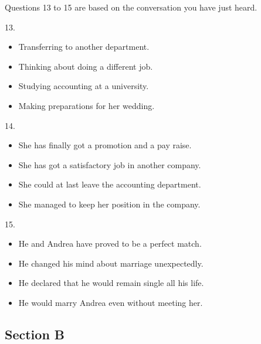 \documentclass[UTF8,11pt]{ctexart}
\begin{document}
Questions 13 to 15 are based on the conversation you have just heard.


13.


\begin{itemize}[leftmargin=2em,itemsep=.2em,topsep=.4em]\item[A.] Transferring to another department.
\item[C.] Thinking about doing a different job.
\end{itemize}

\begin{itemize}[leftmargin=2em,itemsep=.2em,topsep=.4em]\item[B.] Studying accounting at a university.
\item[D.] Making preparations for her wedding.
\end{itemize}

14.


\begin{itemize}[leftmargin=2em,itemsep=.2em,topsep=.4em]\item[A.] She has finally got a promotion and a pay raise.
\end{itemize}

\begin{itemize}[leftmargin=2em,itemsep=.2em,topsep=.4em]\item[B.] She has got a satisfactory job in another company.
\item[C.] She could at last leave the accounting department.
\item[D.] She managed to keep her position in the company.
\end{itemize}

15.


\begin{itemize}[leftmargin=2em,itemsep=.2em,topsep=.4em]\item[A.] He and Andrea have proved to be a perfect match.
\end{itemize}

\begin{itemize}[leftmargin=2em,itemsep=.2em,topsep=.4em]\item[B.] He changed his mind about marriage unexpectedly.
\item[C.] He declared that he would remain single all his life.
\item[D.] He would marry Andrea even without meeting her.
\end{itemize}

\subsection*{\textbf{Section B}}
\end{document}
